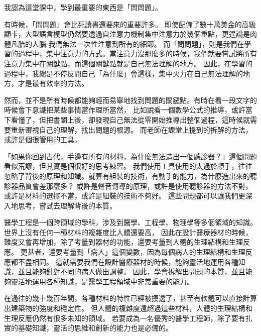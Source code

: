 \documentclass[12pt,a4paper]{article}
\begin{document}

我認為這堂課中，學到最重要的東西是「問問題」。

有時候，「問問題」會比死讀書還要來的重要許多。
即使配備了數十萬美金的高級顯卡，大型語言模型仍然要透過自注意力機制集中注意力於幾個重點，更遑論是肉體凡胎的人腦-我們無法一次性注意到所有的細節。
而「問問題」，則是我們在學習的過程中，集中注意力的方式。當注意力沒那麼多的時候，我們就要嘗試將所有注意力集中在關鍵點，而這個關鍵點就是自己無法理解的地方。
因此，在學習的過程中，我總是不停反問自己「為什麼」會這樣，集中火力在自己無法理解的地方，才是最有效率的方法。

然而，並不是所有時候都能夠輕而易舉地找到問題的關鍵點。有時在看一段文字的時候會下意識把某些事情當作理所當然，
比如說看一個數學公式的推導，或許當下看懂了，但把書闔上後，卻發現自己無法從零開始推導出整個過程，這時候就需要重新審視自己的理解，找出問題的根源。
而老師在課堂上提到的拆解的方法，或許是個很管用的工具。

「如果你回到古代，手邊有所有的材料，為什麼無法造出一個聽診器？」這個問題看似荒謬，但其實是個很好的思考練習。
我們使用工具使用的太過於順手，往往忽略了背後的原理和知識。就算有組裝的技術，有動手的能力，為什麼造出來的聽診器品質會差那麼多？
或許是聲音傳導的原理，或許是使用聽診器的方法不對，或許是材料的選擇不當，或許是組裝的技術不夠好。
這些問題都可以讓我們更深入地思考，嘗試去理解背後的本質。

醫學工程是一個跨領域的學科，涉及到醫學、工程學、物理學等多個領域的知識。
世界上沒有任何一種材料的複雜度比人體還要高，
因此在設計醫療器材的時候，難度又會再增加，除了考量到器材的功能，還要考量到人體的生理結構和生理反應。
更甚者，還要考量到「病人」這個變數，因為每個病人的生理結構和生理反應都不盡相同。
這就需要我們在設計醫療器材的時候，能夠靈活地運用各種知識，並且能夠針對不同的病人做出調整。
因此，學會拆解出問題的本質，並且能夠靈活地運用各種知識，是醫學工程領域中非常重要的能力。

在過往的幾十幾百年間，各種材料的特性已經被摸透了，甚至有軟體可以直接計算出建築物的強度和穩定性。
但人體的複雜度遠超過這些材料，人體的生理結構和生理反應仍然有很多未知的領域。
若要成為一名優秀的醫學工程師，除了要有扎實的基礎知識，靈活的思維和創新的能力也是必備的。
\end{document}
